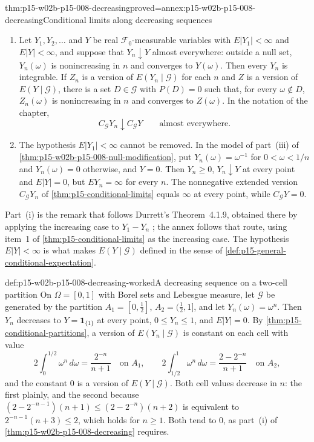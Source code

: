 \begin{hbtheorem}{thm:p15-w02b-p15-008-decreasing}{proved=annex:p15-w02b-p15-008-decreasing}{Conditional limits along decreasing sequences}
\begin{enumerate}
\item Let \(Y_1,Y_2,\ldots\) and \(Y\) be real
      \(\mathcal F_0\)-measurable variables with \(E|Y_1|<\infty\) and
      \(E|Y|<\infty\), and suppose that \(Y_n\downarrow Y\) almost
      everywhere: outside a null set, \(Y_n(\omega)\) is nonincreasing in
      \(n\) and converges to \(Y(\omega)\). Then every \(Y_n\) is
      integrable. If \(Z_n\) is a version of \(E(Y_n\mid\mathcal G)\) for
      each \(n\) and \(Z\) is a version of \(E(Y\mid\mathcal G)\), there is
      a set \(D\in\mathcal G\) with \(P(D)=0\) such that, for every
      \(\omega\notin D\), \(Z_n(\omega)\) is nonincreasing in \(n\) and
      converges to \(Z(\omega)\). In the notation of the chapter,
      \[
           C_{\mathcal G}Y_n\downarrow C_{\mathcal G}Y
           \qquad\text{almost everywhere.}
      \]
\item The hypothesis \(E|Y_1|<\infty\) cannot be removed. In the model of
      part~(iii) of \cref{thm:p15-w02b-p15-008-null-modification}, put
      \(Y_n(\omega)=\omega^{-1}\) for \(0<\omega<1/n\) and
      \(Y_n(\omega)=0\) otherwise, and \(Y=0\). Then
      \(Y_n\geq0\), \(Y_n\downarrow Y\) at every point and \(E|Y|=0\), but
      \(EY_n=\infty\) for every \(n\). The nonnegative extended version
      \(C_{\mathcal G}Y_n\) of \cref{thm:p15-conditional-limits} equals
      \(\infty\) at every point, while \(C_{\mathcal G}Y=0\).
\end{enumerate}
\end{hbtheorem}

Part~(i) is the remark that follows Durrett's Theorem~4.1.9, obtained
there by applying the increasing case to \(Y_1-Y_n\)
\cite[p.~210]{DurrettPTEAuthor2019}; the annex follows that route,
using item~1 of \cref{thm:p15-conditional-limits} as the increasing case.
The hypothesis \(E|Y|<\infty\) is what makes \(E(Y\mid\mathcal G)\)
defined in the sense of \cref{def:p15-general-conditional-expectation}.

\begin{hbexample}{def:p15-w02b-p15-008-decreasing-worked}{A decreasing sequence on a two-cell partition}
On \(\Omega=[0,1]\) with Borel sets and Lebesgue measure, let
\(\mathcal G\) be generated by the partition \(A_1=[0,\tfrac12]\),
\(A_2=(\tfrac12,1]\), and let \(Y_n(\omega)=\omega^n\). Then
\(Y_n\) decreases to \(Y=\mathbf1_{\{1\}}\) at every point, \(0\leq Y_n\leq1\),
and \(E|Y|=0\). By \cref{thm:p15-conditional-partitions}, a version of
\(E(Y_n\mid\mathcal G)\) is constant on each cell with value
\[
 2\int_0^{1/2}\omega^n\,d\omega=\frac{2^{-n}}{n+1}
 \quad\text{on }A_1,\qquad
 2\int_{1/2}^{1}\omega^n\,d\omega=\frac{2-2^{-n}}{n+1}
 \quad\text{on }A_2,
\]
and the constant \(0\) is a version of \(E(Y\mid\mathcal G)\). Both cell
values decrease in \(n\): the first plainly, and the second because
\((2-2^{-n-1})(n+1)\leq(2-2^{-n})(n+2)\) is equivalent to
\(2^{-n-1}(n+3)\leq2\), which holds for \(n\geq1\). Both tend to \(0\),
as part~(i) of \cref{thm:p15-w02b-p15-008-decreasing} requires.
\end{hbexample}

